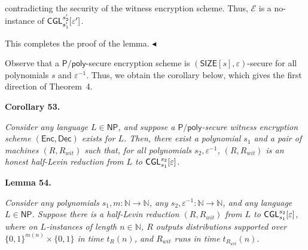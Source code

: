 contradicting the security of the witness encryption scheme. Thus, $\mathcal{E}$ is a no-instance of ${\sf CGL}_{s_{1}^{\prime}}^{s_{2}^{\prime}}[\varepsilon^{\prime}]$.\par




This completes the proof of the lemma.
$\blacktriangleleft$\par




Observe that a ${\mathsf{P}}/{\mathsf{poly}}$-secure encryption scheme is $({\mathsf{SIZE}}[s],\varepsilon)$-secure for all polynomials $s$ and $\varepsilon^{-1}$. Thus, we obtain the corollary below, which gives the first direction of Theorem 4.\par





\par\medskip\noindent\textbf{
\textbf{Corollary 53}\textbf{.}
}\par



\emph{Consider any language $L\in{\mathsf{NP}}$, and suppose a ${\mathsf{P}}/{\mathsf{poly}}$-secure witness encryption scheme $({\mathsf{Enc}},{\mathsf{Dec}})$ exists for $L$. Then, there exist a polynomial $s_{1}$ and a pair of machines $(R,R_{wit})$ such that, for all polynomials $s_{2},\varepsilon^{-1}$, $(R,R_{wit})$ is an honest half-Levin reduction from $L$ to ${\sf CGL}^{s_{2}}_{s_{1}}[\varepsilon]$.}\par







\par\medskip\noindent\textbf{
\textbf{Lemma 54}\textbf{.}
}\par



\emph{Consider any polynomials $s_{1},m:\mathbb{N}\to\mathbb{N}$, any $s_{2},\varepsilon^{-1}:\mathbb{N}\to\mathbb{N}$, and any language $L\in{\mathsf{NP}}$. Suppose there is a half-Levin reduction $(R,R_{wit})$ from $L$ to ${\sf CGL}_{s_{1}}^{s_{2}}[\varepsilon]$, where on $L$-instances of length $n\in\mathbb{N}$, $R$ outputs distributions supported over $\{0,1\}^{m(n)}\times\{0,1\}$ in time $t_{R}(n)$, and $R_{wit}$ runs in time $t_{R_{wit}}(n)$.}\par




